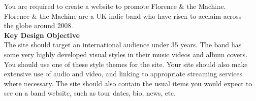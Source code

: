 
You are required to create a website to promote Florence \& the Machine.  Florence \& the Machine are a UK indie band who have risen to acclaim across the globe around 2008.\\ 


\textbf{Key Design Objective}\\





The site should target an international audience under 35 years.  The band has some very highly developed visual styles in their music videos and album covers.  You should use one of these style themes for the site.  Your site should also make extensive use of audio and video, and linking to appropriate streaming services where necessary.  The site should also contain the usual items you would expect to see on a band website, such as tour dates, bio, news, etc.\\


